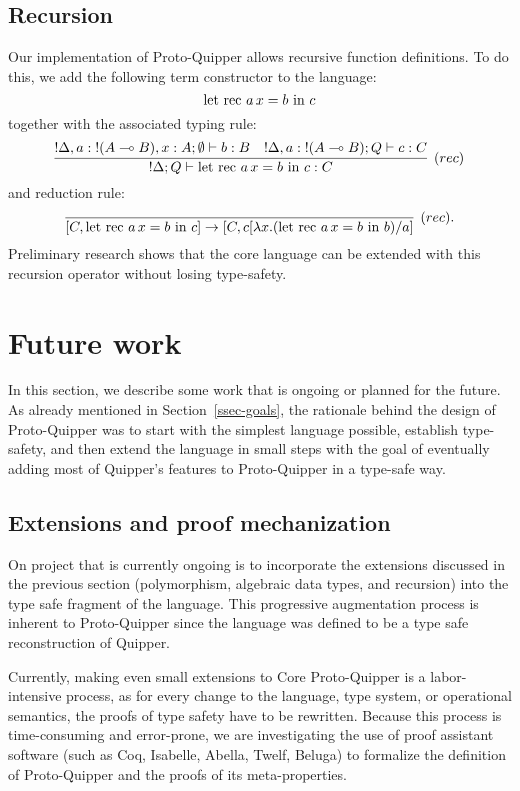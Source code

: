 \documentclass[twoside]{article}
\begin{document}
\subsection{Recursion}

Our implementation of Proto-Quipper allows recursive function
definitions. To do this, we add the following term constructor to the
language:
\[
\textrm{\rm let rec}~ a\,x = b ~\textrm{\rm in}~ c
\]    
together with the associated typing rule:
\[
\infer[(rec)]{{!}\Delta;Q \entails \letrecin{a\,x}{b}{c}:C}{
  {!}\Delta,a:{!}(A\loli B), x:A;\emptyset \entails b:B
  &
  {!}\Delta, a:{!}(A\loli B) ;Q \entails c:C      
}
\]
and reduction rule:
\[
\infer[(rec).]{[C,\letrecin{a\,x}{b}{c}]\to [C, c[\lambda x.(\letrecin{a\,x}{b}{b})/a]}{}
\]
Preliminary research shows that the core language can be extended 
with this recursion operator without losing type-safety. 

\clearpage
\section{Future work}\label{sec-future}

In this section, we describe some work that is ongoing or planned for
the future. As already mentioned in Section~\ref{ssec-goals}, the
rationale behind the design of Proto-Quipper was to start with the
simplest language possible, establish type-safety, and then extend the
language in small steps with the goal of eventually adding most of
Quipper's features to Proto-Quipper in a type-safe way. 

\subsection{Extensions and proof mechanization}

On project that is currently ongoing is to incorporate the extensions
discussed in the previous section (polymorphism, algebraic data types,
and recursion) into the type safe fragment of the language. This
progressive augmentation process is inherent to Proto-Quipper since
the language was defined to be a type safe reconstruction of
Quipper. 

Currently, making even small extensions to Core Proto-Quipper is a
labor-intensive process, as for every change to the language, type
system, or operational semantics, the proofs of type safety have to be
rewritten. Because this process is time-consuming and error-prone, we
are investigating the use of proof assistant software (such as Coq,
Isabelle, Abella, Twelf, Beluga) to formalize the definition of
Proto-Quipper and the proofs of its meta-properties.
\end{document}
